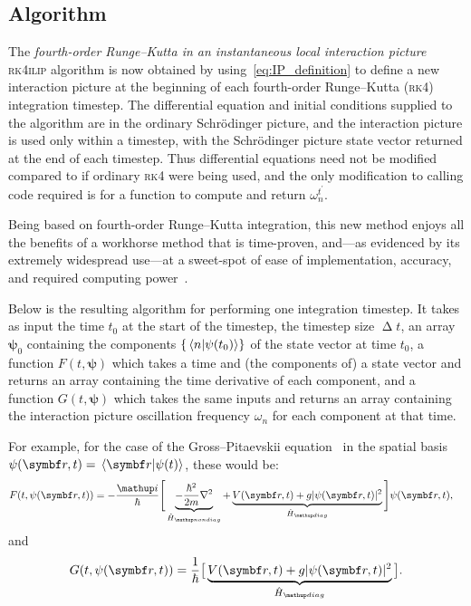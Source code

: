 \subsection{Algorithm}
The \emph{fourth-order Runge--Kutta in an instantaneous local interaction picture} \textsc{rk4ilip} algorithm is now obtained by using~\eqref{eq:IP_definition} to define a new interaction picture at the beginning of each fourth-order Runge–Kutta (\textsc{rk4}) integration timestep. The differential equation and initial conditions supplied to the algorithm are in the ordinary Schr\"odinger picture, and the interaction picture is used only within a timestep, with the Schr\"odinger picture state vector returned at the end of each timestep. Thus differential equations need not be modified compared to if ordinary \textsc{rk4} were being used, and the only modification to calling code required is for a function to compute and return $\omega_n^{t^\prime}$.

Being based on fourth-order Runge--Kutta integration, this new method enjoys all the benefits of a workhorse method that is time-proven, and---as evidenced by its extremely widespread use---at a sweet-spot of ease of implementation, accuracy, and required computing power~\cite{artofscientificcomputing1992}.

Below is the resulting algorithm for performing one integration timestep. It takes as input the time $t_0$ at the start of the timestep, the timestep size $\upDelta t$, an array $\mathbf{\psi}_0$ containing the components $\{\braket{n}{\psi(t_0)}\}$ of the state vector at time $t_0$, a function $F(t, \mathbf{\psi})$ which takes a time and (the components of) a state vector and returns an array containing the time derivative of each component, and a function $G(t, \mathbf{\psi})$ which takes the same inputs and returns an array containing the interaction picture oscillation frequency $\omega_n$ for each component at that time.

For example, for the case of the Gross--Pitaevskii equation~\cite{pethick2002bose} in the spatial basis $\psi(\vec r, t) = \braket{\vec r}{\psi(t)}$, these would be:
\begin{align}\label{eq:RK4_ILIP_GPE}
F(t, \psi(\vec r, t)) &= -\frac \ii \hbar\Bigg[\underbrace{-\frac{\hbar^2}{2m}\nabla^2}_{\hat H_\up{nondiag}} + \underbrace{V(\vec r, t) + g|\psi(\vec r, t)|^2}_{\hat H_\up{diag}}\Bigg]\psi(\vec r, t),
\end{align}
and
\begin{align}
G(t, \psi(\vec r, t)) = \frac1\hbar\big[\underbrace{V(\vec r, t) + g|\psi(\vec r, t)|^2}_{\hat H_\up{diag}}\big].
\end{align}

